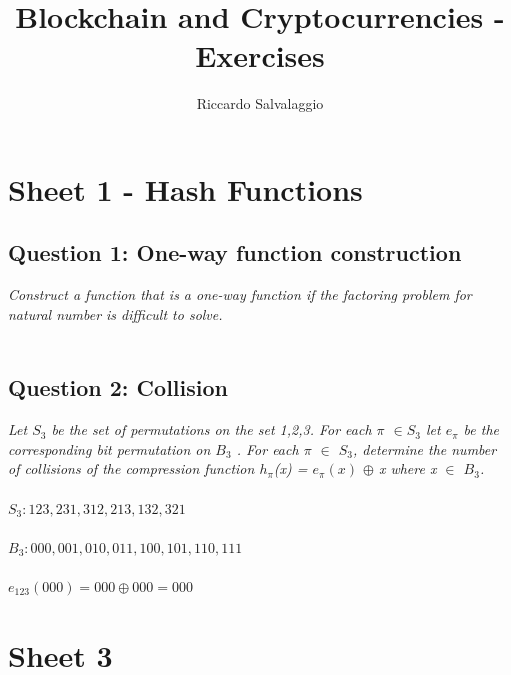 \documentclass{article}
\title{Blockchain and Cryptocurrencies - Exercises}
\author{Riccardo Salvalaggio}
\begin{document}
\maketitle
\newpage
\tableofcontents
\newpage
\section{Sheet 1 - Hash Functions}
\subsection{Question 1: One-way function construction}
\textit{Construct a function that is a one-way function if the factoring problem for natural number is difficult to solve.}\\\\









\subsection{Question 2: Collision}
\textit{Let $S_3$ be the set of permutations on the set {1,2,3}. For each $\pi$ $\in S_3$ let $e_\pi$ be the corresponding bit permutation on $B_3$ . For each $\pi$ $\in$ $S_3$, determine the number of collisions of the compression function $h_\pi$(x) = $e_\pi(x)$ $\oplus$ x where x $\in$ $B_3$.}\\\\

$S_3: {123,231,312,213,132,321}$\\\\

$B_3: {000,001,010,011,100,101,110,111}$\\\\

$e_{123}(000) = 000 \oplus 000 = 000 $


























\section{Sheet 3}
\end{document}
